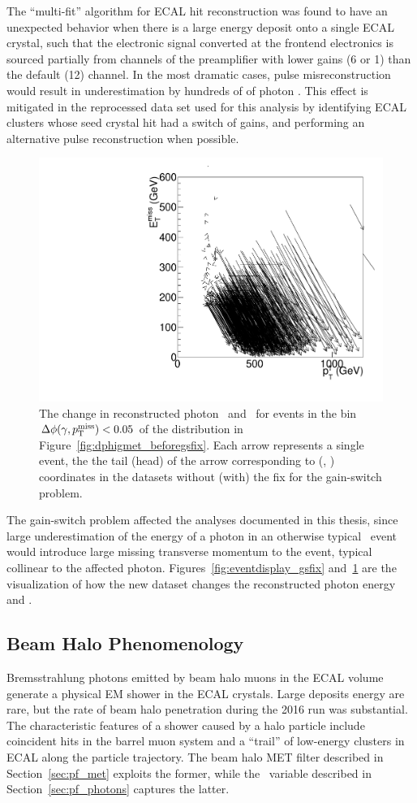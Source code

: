 The ``multi-fit'' algorithm for ECAL hit reconstruction was found to have an unexpected behavior when there is a large energy deposit onto a single ECAL crystal, such that the electronic signal converted at the frontend electronics is sourced partially from channels of the preamplifier with lower gains (6 or 1) than the default (12) channel. 
In the most dramatic cases, pulse misreconstruction would result in underestimation by hundreds of \GeV of photon \pt. 
This effect is mitigated in the reprocessed data set used for this analysis by identifying ECAL clusters whose seed crystal hit had a switch of gains, and performing an alternative pulse reconstruction when possible.

\begin{figure}[htbp]
  \centering
  \includegraphics[width=0.48\linewidth]{Reconstruction/Figures/gsfix/movements.pdf}
  \caption{
    The change in reconstructed photon \pt\ and \met\ for events in the bin $\Delta \phi(\gamma, p_{\mathrm{T}}^\text{miss}) < 0.05$ of the distribution in Figure~\ref{fig:dphigmet_beforegsfix}. 
    Each arrow represents a single event, the the tail (head) of the arrow corresponding to (\ETg, \met) coordinates in the datasets without (with) the fix for the gain-switch problem.
  }
  \label{fig:ptshift_gsfix}
\end{figure}

The gain-switch problem affected the analyses documented in this thesis, since large underestimation of the energy of a photon in an otherwise typical \gj\ event would introduce large missing transverse momentum to the event, typical collinear to the affected photon. 
Figures~\ref{fig:eventdisplay_gsfix} and~\ref{fig:ptshift_gsfix} are the visualization of how the new dataset changes the reconstructed photon energy and \met.

\subsection{Beam Halo Phenomenology}
\label{sec:halo}

Bremsstrahlung photons emitted by beam halo muons in the ECAL volume generate a physical EM shower in the ECAL crystals. 
Large deposits energy are rare, but the rate of beam halo penetration during the 2016 run was substantial. 
The characteristic features of a shower caused by a halo particle include coincident hits in the barrel muon system and a ``trail'' of low-energy clusters in ECAL along the particle trajectory. 
The beam halo MET filter described in Section~\ref{sec:pf_met} exploits the former, while the \emip\ variable described in Section~\ref{sec:pf_photons} captures the latter.

